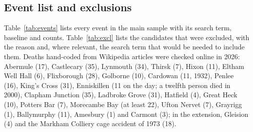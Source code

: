 \documentclass[11pt,a4paper]{article}
\begin{document}
\subsection{Event list and exclusions}
Table~\ref{tab:events} lists every event in the main sample with its search term, baseline and counts. Table~\ref{tab:excl} lists the candidates that were excluded, with the reason and, where relevant, the search term that would be needed to include them. Deaths hand-coded from Wikipedia articles were checked online in 2026: Abermule (17), Castlecary (35), Lynmouth (34), Thirsk (7), Hixon (11), Eltham Well Hall (6), Flixborough (28), Golborne (10), Cardowan (11, 1932), Penlee (16), King's Cross (31), Enniskillen (11 on the day; a twelfth person died in 2000), Clapham Junction (35), Ladbroke Grove (31), Hatfield (4), Great Heck (10), Potters Bar (7), Morecambe Bay (at least 22), Ufton Nervet (7), Grayrigg (1), Ballymurphy (11), Amesbury (1) and Carmont (3); in the extension, Gleision (4) and the Markham Colliery cage accident of 1973 (18).
\end{document}
